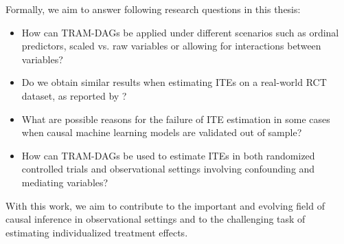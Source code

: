 Formally, we aim to answer following research questions in this thesis:

\begin{itemize}
    \item How can TRAM-DAGs be applied under different scenarios such as ordinal predictors, scaled vs. raw variables or allowing for interactions between variables?
    \item Do we obtain similar results when estimating ITEs on a real-world RCT dataset, as reported by \citet{chen2025}?
    \item What are possible reasons for the failure of ITE estimation in some cases when causal machine learning models are validated out of sample?
    \item How can TRAM-DAGs be used to estimate ITEs in both randomized controlled trials and observational settings involving confounding and mediating variables?
\end{itemize}



With this work, we aim to contribute to the important and evolving field of causal inference in observational settings and to the challenging task of estimating individualized treatment effects.

